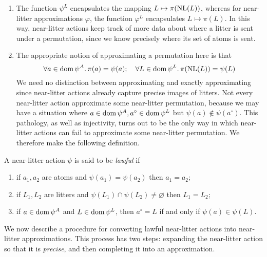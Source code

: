 \begin{remarks}
    \begin{enumerate}
        \item The function \( \psi^L \) encapsulates the mapping \( L \mapsto \pi(\operatorname{NL}(L)) \), whereas for near-litter approximations \( \varphi \), the function \( \varphi^L \) encapsulates \( L \mapsto \pi(L) \).
        In this way, near-litter actions keep track of more data about where a litter is sent under a permutation, since we know precisely where its set of atoms is sent.
        \item The appropriate notion of approximating a permutation here is that
        \[ \forall a \in \operatorname{dom} \psi^A.\, \pi(a) = \psi(a);\quad \forall L \in \operatorname{dom} \psi^L.\, \pi(\operatorname{NL}(L)) = \psi(L) \]
        We need no distinction between approximating and exactly approximating since near-litter actions already capture precise images of litters.
        Not every near-litter action approximate some near-litter permutation, because we may have a situation where \( a \in \operatorname{dom} \psi^A, a^\circ \in \operatorname{dom} \psi^L \) but \( \psi(a) \notin \psi(a^\circ) \).
        This pathology, as well as injectivity, turns out to be the only way in which near-litter actions can fail to approximate some near-litter permutation.
        We therefore make the following definition.
    \end{enumerate}
\end{remarks}

\begin{definition}
    A near-litter action \( \psi \) is said to be \emph{lawful} if
    \begin{enumerate}
        \item if \( a_1, a_2 \) are atoms and \( \psi(a_1) = \psi(a_2) \) then \( a_1 = a_2 \);
        \item if \( L_1, L_2 \) are litters and \( \psi(L_1) \cap \psi(L_2) \neq \varnothing \) then \( L_1 = L_2 \);
        \item if \( a \in \operatorname{dom} \psi^A \) and \( L \in \operatorname{dom} \psi^L \), then \( a^\circ = L \) if and only if \( \psi(a) \in \psi(L) \).
    \end{enumerate}
\end{definition}

We now describe a procedure for converting lawful near-litter actions into near-litter approximations.
This process has two steps: expanding the near-litter action so that it is \emph{precise}, and then completing it into an approximation.

